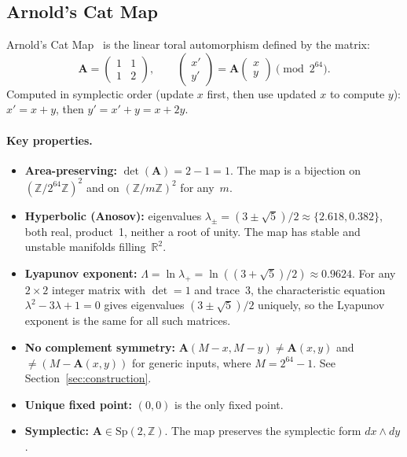 \documentclass[runningheads]{llncs}
\newcommand{\Ztwo}{\mathbb{Z}/2^{64}\mathbb{Z}}
\newcommand{\catmap}{\mathbf{A}}
\begin{document}
\subsection{Arnold's Cat Map}

Arnold's Cat Map~\cite{arnold1968ergodic} is the linear toral automorphism
defined by the matrix:
\[
  \catmap = \begin{pmatrix} 1 & 1 \\ 1 & 2 \end{pmatrix}, \qquad
  \begin{pmatrix} x' \\ y' \end{pmatrix}
  = \catmap \begin{pmatrix} x \\ y \end{pmatrix} \pmod{2^{64}}.
\]
Computed in symplectic order (update $x$ first, then use updated $x$ to compute $y$): $x' = x + y$, then $y' = x' + y = x + 2y$.

\paragraph{Key properties.}
\begin{itemize}[nosep]
\item \textbf{Area-preserving:} $\det(\catmap) = 2 - 1 = 1$.
  The map is a bijection on $(\Ztwo)^2$ and on $(\mathbb{Z}/m\mathbb{Z})^2$ for any~$m$.
\item \textbf{Hyperbolic (Anosov):} eigenvalues $\lambda_{\pm} = (3 \pm \sqrt{5})/2
  \approx \{2.618, 0.382\}$, both real, product~1, neither a root of unity.
  The map has stable and unstable manifolds filling~$\mathbb{R}^2$.
\item \textbf{Lyapunov exponent:} $\Lambda = \ln\lambda_+ = \ln((3+\sqrt{5})/2) \approx 0.9624$.
  For any $2 \times 2$ integer matrix with $\det = 1$ and trace~3,
  the characteristic equation $\lambda^2 - 3\lambda + 1 = 0$ gives
  eigenvalues $(3 \pm \sqrt{5})/2$ uniquely, so the Lyapunov exponent
  is the same for all such matrices.
\item \textbf{No complement symmetry:}
  $\catmap(M-x, M-y) \neq \catmap(x,y)$ and $\neq (M - \catmap(x,y))$ for
  generic inputs, where $M = 2^{64} - 1$.  See Section~\ref{sec:construction}.
\item \textbf{Unique fixed point:} $(0,0)$ is the only fixed point.
\item \textbf{Symplectic:} $\catmap \in \mathrm{Sp}(2, \mathbb{Z})$.
  The map preserves the symplectic form $dx \wedge dy$.
\end{itemize}
\end{document}
